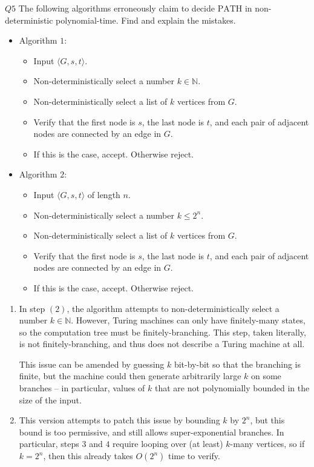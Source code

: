 \documentclass{article}
\theoremstyle{definition}
\theoremstyle{definition}
\theoremstyle{remark}
\begin{document}
\begin{questionbox}{$Q5$}
    The following algorithms erroneously claim to decide $\text{PATH}$ in non-deterministic polynomial-time. Find and explain the mistakes.
    \begin{itemize}
        \item Algorithm $1$:
        \begin{itemize}
            \item[$(1)$] Input $\langle G,s,t\rangle$.
            \item[$(2)$] Non-deterministically select a number $k\in\mathbb{N}$.
            \item[$(3)$] Non-deterministically select a list of $k$ vertices from $G$.
            \item[$(4)$] Verify that the first node is $s$, the last node is $t$, and each pair of adjacent nodes are connected by an edge in $G$.
            \item[$(5)$] If this is the case, accept. Otherwise reject.
        \end{itemize}
        \item Algorithm $2$:
        \begin{itemize}
            \item[$(1)$] Input $\langle G,s,t\rangle$ of length $n$.
            \item[$(2)$] Non-deterministically select a number $k\leq 2^n$.
            \item[$(3)$] Non-deterministically select a list of $k$ vertices from $G$.
            \item[$(4)$] Verify that the first node is $s$, the last node is $t$, and each pair of adjacent nodes are connected by an edge in $G$.
            \item[$(5)$] If this is the case, accept. Otherwise reject.
        \end{itemize}
    \end{itemize}
\end{questionbox}

\bigskip

\begin{enumerate}
    \item[$(i)$] In step $(2)$, the algorithm attempts to non-deterministically select a number $k\in\mathbb{N}$. However, Turing machines can only have finitely-many states, so the computation tree must be finitely-branching. This step, taken literally, is not finitely-branching, and thus does not describe a Turing machine at all.
    
    This issue can be amended by guessing $k$ bit-by-bit so that the branching is finite, but the machine could then generate arbitrarily large $k$ on some branches -- in particular, values of $k$ that are not polynomially bounded in the size of the input.
    
    \item[$(ii)$] This version attempts to patch this issue by bounding $k$ by $2^n$, but this bound is too permissive, and still allows super-exponential branches. In particular, steps $3$ and $4$ require looping over (at least) $k$-many vertices, so if $k=2^n$, then this already takes $O(2^n)$ time to verify.
\end{enumerate}
\end{document}
